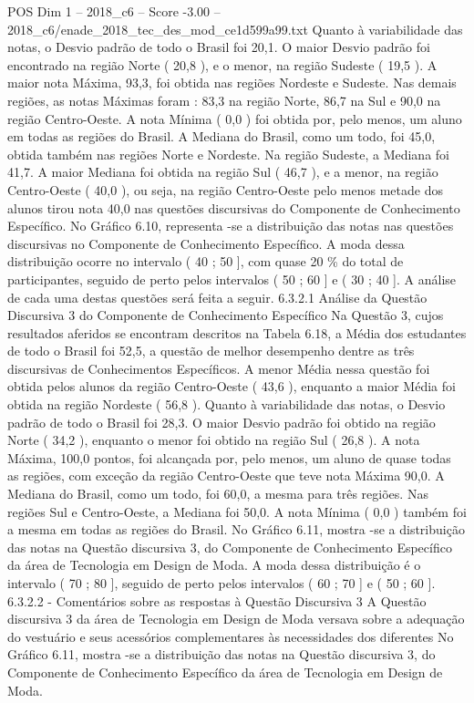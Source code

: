 \begin{textsample}{POS Dim 1 – 2018\_c6 – Score -3.00 – 2018\_c6/enade\_2018\_tec\_des\_mod\_ce1d599a99.txt}
Quanto à variabilidade das notas, o Desvio padrão de todo o Brasil foi 20,1.
O maior Desvio padrão foi encontrado na região Norte ( 20,8 ), e o menor, na região Sudeste ( 19,5 ).
A maior nota Máxima, 93,3, foi obtida nas regiões Nordeste e Sudeste.
Nas demais regiões, as notas Máximas foram : 83,3 na região Norte, 86,7 na Sul e 90,0 na região Centro-Oeste.
A nota Mínima ( 0,0 ) foi obtida por, pelo menos, um aluno em todas as regiões do Brasil.
A Mediana do Brasil, como um todo, foi 45,0, obtida também nas regiões Norte e Nordeste.
Na região Sudeste, a Mediana foi 41,7.
A maior Mediana foi obtida na região Sul ( 46,7 ), e a menor, na região Centro-Oeste ( 40,0 ), ou seja, na região Centro-Oeste pelo menos metade dos alunos tirou nota 40,0 nas questões discursivas do Componente de Conhecimento Específico.
No Gráfico 6.10, representa -se a distribuição das notas nas questões discursivas no Componente de Conhecimento Específico.
A moda dessa distribuição ocorre no intervalo ( 40 ; 50 ], com quase 20 \% do total de participantes, seguido de perto pelos intervalos ( 50 ; 60 ] e ( 30 ; 40 ].
A análise de cada uma destas questões será feita a seguir. 6.3.2.1 Análise da Questão Discursiva 3 do Componente de Conhecimento Específico Na Questão 3, cujos resultados aferidos se encontram descritos na Tabela 6.18, a Média dos estudantes de todo o Brasil foi 52,5, a questão de melhor desempenho dentre as três discursivas de Conhecimentos Específicos.
A menor Média nessa questão foi obtida pelos alunos da região Centro-Oeste ( 43,6 ), enquanto a maior Média foi obtida na região Nordeste ( 56,8 ).
Quanto à variabilidade das notas, o Desvio padrão de todo o Brasil foi 28,3.
O maior Desvio padrão foi obtido na região Norte ( 34,2 ), enquanto o menor foi obtido na região Sul ( 26,8 ).
A nota Máxima, 100,0 pontos, foi alcançada por, pelo menos, um aluno de quase todas as regiões, com exceção da região Centro-Oeste que teve nota Máxima 90,0.
A Mediana do Brasil, como um todo, foi 60,0, a mesma para três regiões.
Nas regiões Sul e Centro-Oeste, a Mediana foi 50,0.
A nota Mínima ( 0,0 ) também foi a mesma em todas as regiões do Brasil.
No Gráfico 6.11, mostra -se a distribuição das notas na Questão discursiva 3, do Componente de Conhecimento Específico da área de Tecnologia em Design de Moda.
A moda dessa distribuição é o intervalo ( 70 ; 80 ], seguido de perto pelos intervalos ( 60 ; 70 ] e ( 50 ; 60 ]. 6.3.2.2 - Comentários sobre as respostas à Questão Discursiva 3 A Questão discursiva 3 da área de Tecnologia em Design de Moda versava sobre a adequação do vestuário e seus acessórios complementares às necessidades dos diferentes No Gráfico 6.11, mostra -se a distribuição das notas na Questão discursiva 3, do Componente de Conhecimento Específico da área de Tecnologia em Design de Moda.

\end{textsample}
